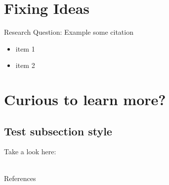 \section{Fixing Ideas}
\begin{frame}

\begin{mybox}{Research Question:}{}
Example some citation \cite{Drechsler2024}
\end{mybox}


\begin{itemize}
  \item item 1
  \item item 2
\end{itemize}



\end{frame}


\section{Curious to learn more?}
\subsection{Test subsection style}
\begin{frame}

\begin{center}
Take a look here: \\~\\
\end{center}

\end{frame}
\begin{frame}[allowframebreaks]{References}
    \printbibliography
\end{frame}

